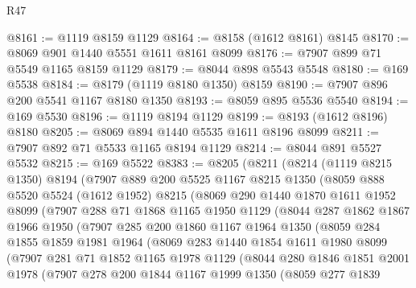 \begin{lexlean}{R47}
\begin{coremodule}
@8161 := @1119 @8159 @1129
@8164 := @8158 (@1612 @8161) @8145
@8170 := @8069 @901 @1440 @5551 @1611 @8161 @8099
@8176 := @7907 @899 @71 @5549 @1165 @8159 @1129
@8179 := @8044 @898 @5543 @5548
@8180 := @169 @5538
@8184 := @8179 (@1119 @8180 @1350) @8159
@8190 := @7907 @896 @200 @5541 @1167 @8180 @1350
@8193 := @8059 @895 @5536 @5540
@8194 := @169 @5530
@8196 := @1119 @8194 @1129
@8199 := @8193 (@1612 @8196) @8180
@8205 := @8069 @894 @1440 @5535 @1611 @8196 @8099
@8211 := @7907 @892 @71 @5533 @1165 @8194 @1129
@8214 := @8044 @891 @5527 @5532
@8215 := @169 @5522
@8383 := @8205
    (@8211
      (@8214
        (@1119 @8215 @1350)
        @8194
        (@7907
          @889
          @200
          @5525
          @1167
          @8215
          @1350
          (@8059
            @888
            @5520
            @5524
            (@1612 @1952)
            @8215
            (@8069
              @290
              @1440
              @1870
              @1611
              @1952
              @8099
              (@7907
                @288
                @71
                @1868
                @1165
                @1950
                @1129
                (@8044
                  @287
                  @1862
                  @1867
                  @1966
                  @1950
                  (@7907
                    @285
                    @200
                    @1860
                    @1167
                    @1964
                    @1350
                    (@8059
                      @284
                      @1855
                      @1859
                      @1981
                      @1964
                      (@8069
                        @283
                        @1440
                        @1854
                        @1611
                        @1980
                        @8099
                        (@7907
                          @281
                          @71
                          @1852
                          @1165
                          @1978
                          @1129
                          (@8044
                            @280
                            @1846
                            @1851
                            @2001
                            @1978
                            (@7907
                              @278
                              @200
                              @1844
                              @1167
                              @1999
                              @1350
                              (@8059
                                @277
                                @1839

\end{coremodule}
\end{lexlean}
